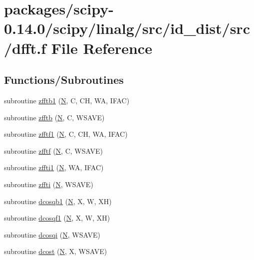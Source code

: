 \hypertarget{dfft_8f}{}\section{packages/scipy-\/0.14.0/scipy/linalg/src/id\+\_\+dist/src/dfft.f File Reference}
\label{dfft_8f}
\subsection*{Functions/\+Subroutines}
\begin{DoxyCompactItemize}
\item 
subroutine \hyperlink{dfft_8f_aff584ac67bf8268a1d0c3fee72d367c6}{zfftb1} (\hyperlink{polmisc_8c_a0240ac851181b84ac374872dc5434ee4}{N}, C, C\+H, W\+A, I\+F\+A\+C)
\item 
subroutine \hyperlink{dfft_8f_ab698eb595703027e1cf9dcac305a4926}{zfftb} (\hyperlink{polmisc_8c_a0240ac851181b84ac374872dc5434ee4}{N}, C, W\+S\+A\+V\+E)
\item 
subroutine \hyperlink{dfft_8f_abefc4bb9377e6bbbbf66c7692dcdf6f3}{zfftf1} (\hyperlink{polmisc_8c_a0240ac851181b84ac374872dc5434ee4}{N}, C, C\+H, W\+A, I\+F\+A\+C)
\item 
subroutine \hyperlink{dfft_8f_af12008ef03c54b5bed140a2e8a96f03c}{zfftf} (\hyperlink{polmisc_8c_a0240ac851181b84ac374872dc5434ee4}{N}, C, W\+S\+A\+V\+E)
\item 
subroutine \hyperlink{dfft_8f_ac363f165b78dcfe30d33d19ca674ff83}{zffti1} (\hyperlink{polmisc_8c_a0240ac851181b84ac374872dc5434ee4}{N}, W\+A, I\+F\+A\+C)
\item 
subroutine \hyperlink{dfft_8f_aeb5f66f9b7b03cd106b8563d955a8917}{zffti} (\hyperlink{polmisc_8c_a0240ac851181b84ac374872dc5434ee4}{N}, W\+S\+A\+V\+E)
\item 
subroutine \hyperlink{dfft_8f_a155f685dde6d634a9f85fbabe99de595}{dcosqb1} (\hyperlink{polmisc_8c_a0240ac851181b84ac374872dc5434ee4}{N}, X, W, X\+H)
\item 
subroutine \hyperlink{dfft_8f_ac0573bb648316f865f0d304207a912f4}{dcosqf1} (\hyperlink{polmisc_8c_a0240ac851181b84ac374872dc5434ee4}{N}, X, W, X\+H)
\item 
subroutine \hyperlink{dfft_8f_a81967ffc821ab16b7ff2e1e6841e1c14}{dcosqi} (\hyperlink{polmisc_8c_a0240ac851181b84ac374872dc5434ee4}{N}, W\+S\+A\+V\+E)
\item 
subroutine \hyperlink{dfft_8f_aa08ecb67a65fdca81ee9674b15746766}{dcost} (\hyperlink{polmisc_8c_a0240ac851181b84ac374872dc5434ee4}{N}, X, W\+S\+A\+V\+E)

\end{DoxyCompactItemize}
